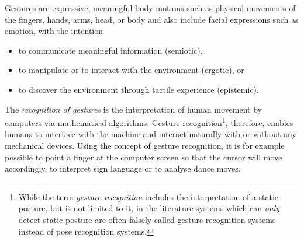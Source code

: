 \documentclass[titlepage,12pt,a4paper]{article}
\begin{document}
Gestures are expressive, meaningful body motions such as physical movements of the fingers, hands, arms, head, or body and also include facial expressions such as emotion, with the intention  
\begin{itemize}
	\item to communicate meaningful information (semiotic),
	\item to manipulate or to interact with the environment (ergotic), or
	\item to discover the environment through tactile experience (epistemic). 
\end{itemize}
The \emph{recognition of gestures} is the interpretation of human movement by computers via mathematical algorithms. Gesture recognition\footnote{While the term \emph{gesture recognition} includes the interpretation of a static posture, but is not limited to it, in the literature systems which can \emph{only} detect static posture are often falsely called gesture recognition systems instead of pose recognition systems. }, therefore, enables humans to interface with the machine and interact naturally with or without any mechanical devices. Using the concept of gesture recognition, it is for example possible to point a finger at the computer screen so that the cursor will move accordingly, to interpret sign language or to analyse dance moves.
\end{document}
